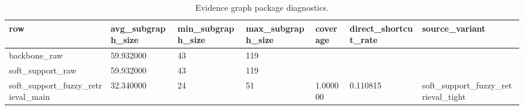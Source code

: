 \begin{table}[t]
\centering
\small
\begin{tabular}{lllllll}
\hline
row & avg\_subgraph\_size & min\_subgraph\_size & max\_subgraph\_size & coverage & direct\_shortcut\_rate & source\_variant \\
\hline
backbone\_raw & 59.932000 & 43 & 119 &  &  &  \\
soft\_support\_raw & 59.932000 & 43 & 119 &  &  &  \\
soft\_support\_fuzzy\_retrieval\_main & 32.340000 & 24 & 51 & 1.000000 & 0.110815 & soft\_support\_fuzzy\_retrieval\_tight \\
\hline
\end{tabular}
\caption{Evidence graph package diagnostics.}
\label{tab:graph-package}
\end{table}
